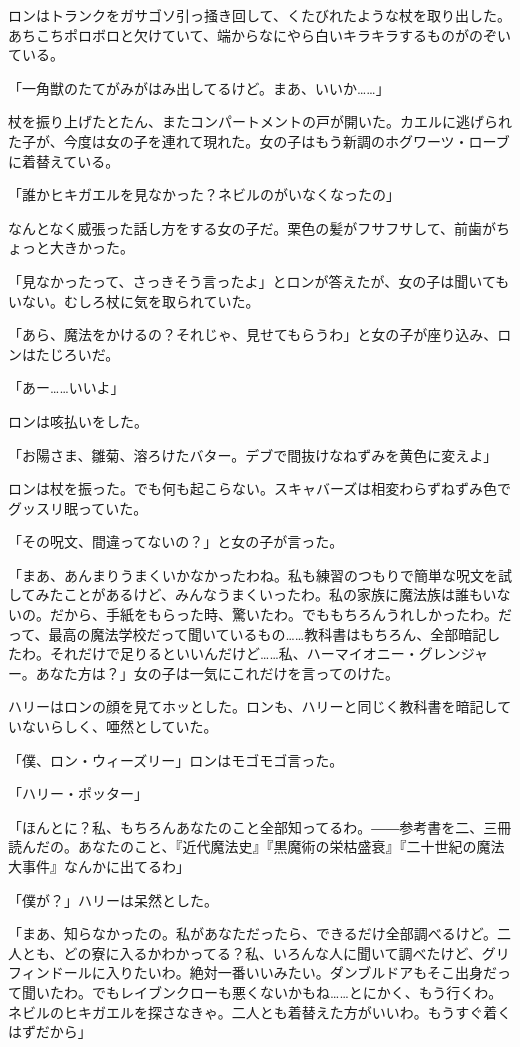 \documentclass[10pt,a4paper]{article}
\begin{document}
\begin{CJK}{UTF8}{min}
ロンはトランクをガサゴソ引っ掻き回して、くたびれたような杖を取り出した。あちこちポロボロと欠けていて、端からなにやら白いキラキラするものがのぞいている。

「一角獣のたてがみがはみ出してるけど。まあ、いいか……」

杖を振り上げたとたん、またコンパートメントの戸が開いた。カエルに逃げられた子が、今度は女の子を連れて現れた。女の子はもう新調のホグワーツ・ローブに着替えている。

「誰かヒキガエルを見なかった？ネビルのがいなくなったの」

なんとなく威張った話し方をする女の子だ。栗色の髪がフサフサして、前歯がちょっと大きかった。

「見なかったって、さっきそう言ったよ」とロンが答えたが、女の子は聞いてもいない。むしろ杖に気を取られていた。

「あら、魔法をかけるの？それじゃ、見せてもらうわ」と女の子が座り込み、ロンはたじろいだ。

「あー……いいよ」

ロンは咳払いをした。

「お陽さま、雛菊、溶ろけたバター。デブで間抜けなねずみを黄色に変えよ」

ロンは杖を振った。でも何も起こらない。スキャバーズは相変わらずねずみ色でグッスリ眠っていた。

「その呪文、間違ってないの？」と女の子が言った。

「まあ、あんまりうまくいかなかったわね。私も練習のつもりで簡単な呪文を試してみたことがあるけど、みんなうまくいったわ。私の家族に魔法族は誰もいないの。だから、手紙をもらった時、驚いたわ。でももちろんうれしかったわ。だって、最高の魔法学校だって聞いているもの……教科書はもちろん、全部暗記したわ。それだけで足りるといいんだけど……私、ハーマイオニー・グレンジャー。あなた方は？」女の子は一気にこれだけを言ってのけた。

ハリーはロンの顔を見てホッとした。ロンも、ハリーと同じく教科書を暗記していないらしく、唖然としていた。

「僕、ロン・ウィーズリー」ロンはモゴモゴ言った。

「ハリー・ポッター」

「ほんとに？私、もちろんあなたのこと全部知ってるわ。――参考書を二、三冊読んだの。あなたのこと、『近代魔法史』『黒魔術の栄枯盛衰』『二十世紀の魔法大事件』なんかに出てるわ」

「僕が？」ハリーは呆然とした。

「まあ、知らなかったの。私があなただったら、できるだけ全部調べるけど。二人とも、どの寮に入るかわかってる？私、いろんな人に聞いて調べたけど、グリフィンドールに入りたいわ。絶対一番いいみたい。ダンブルドアもそこ出身だって聞いたわ。でもレイブンクローも悪くないかもね……とにかく、もう行くわ。ネビルのヒキガエルを探さなきゃ。二人とも着替えた方がいいわ。もうすぐ着くはずだから」


\end{CJK}
\end{document}
